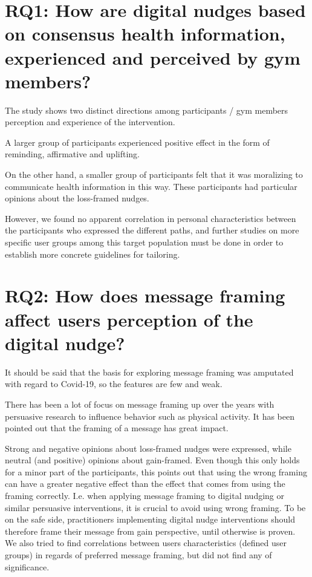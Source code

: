 \section{RQ1: How are digital nudges based on consensus health information, experienced and perceived by gym members?}

The study shows two distinct directions among participants / gym members perception and experience of the intervention. 

A larger group of participants experienced positive effect in the form of reminding, affirmative and uplifting. 


On the other hand, a smaller group of participants felt that it was moralizing to communicate health information in this way. These participants had particular opinions about the loss-framed nudges. 

However, we found no apparent correlation in personal characteristics between the participants who expressed the different paths, and further studies on more specific user groups among this target population must be done in order to establish more concrete guidelines for tailoring. 
\section{RQ2: How does message framing affect users perception of the digital nudge?}

It should be said that the basis for exploring message framing was amputated with regard to Covid-19, so the features are few and weak.

There has been a lot of focus on message framing up over the years with persuasive research to influence behavior such as physical activity. It has been pointed out that the framing of a message has great impact.  

Strong and negative opinions about loss-framed nudges were expressed, while neutral (and positive) opinions about gain-framed. Even though this only holds for a minor part of the participants, this points out that using the wrong framing can have a greater negative effect than the effect that comes from using the framing correctly. I.e. when applying message framing to digital nudging or similar persuasive interventions, it is crucial to avoid using wrong framing. To be on the safe side, practitioners implementing digital nudge interventions should therefore frame their message from gain perspective, until otherwise is proven.  We also tried to find correlations between users characteristics (defined user groups) in regards of preferred message framing, but did not find any of significance. 

